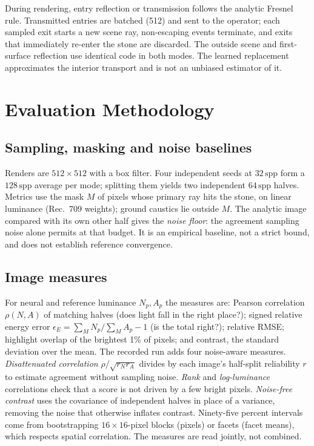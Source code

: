 \documentclass[conference]{IEEEtran}
\newcommand{\spp}{\,\mathrm{spp}}
\begin{document}
During rendering, entry reflection or transmission follows the analytic Fresnel
rule. Transmitted entries are batched (512) and sent to the operator; each
sampled exit starts a new scene ray, non-escaping events terminate, and exits
that immediately re-enter the stone are discarded. The outside scene and
first-surface reflection use identical code in both modes. The learned
replacement approximates the interior transport and is not an unbiased
estimator of it.

\section{Evaluation Methodology}
\label{sec:evaluation}
\subsection{Sampling, masking and noise baselines}
Renders are $512\times512$ with a box filter. Four independent seeds at
$32\spp$ form a $128\spp$ average per mode; splitting them yields two independent
$64\spp$ halves. Metrics use the mask $M$ of pixels whose primary ray hits the
stone, on linear luminance (Rec.~709 weights); ground caustics lie outside $M$.
The analytic image compared with its own other half gives the \emph{noise
floor}: the agreement sampling noise alone permits at that budget. It is an
empirical baseline, not a strict bound, and does not establish reference
convergence.

\subsection{Image measures}
For neural and reference luminance $N_p,A_p$ the measures are: Pearson
correlation $\rho(N,A)$ of matching halves (does light fall in the right
place?); signed relative energy error
$\epsilon_E=\sum_M N_p/\sum_M A_p-1$ (is the total right?); relative RMSE;
highlight overlap of the brightest 1\% of pixels; and contrast, the standard
deviation over the mean. The recorded run adds four noise-aware measures.
\emph{Disattenuated correlation} $\rho/\sqrt{r_Nr_A}$ divides by each image's
half-split reliability $r$ to estimate agreement without sampling noise.
\emph{Rank} and \emph{log-luminance} correlations check that a score is not
driven by a few bright pixels. \emph{Noise-free contrast} uses the covariance of
independent halves in place of a variance, removing the noise that otherwise
inflates contrast. Ninety-five percent intervals come from bootstrapping
$16\times16$-pixel blocks (pixels) or facets (facet means), which respects
spatial correlation. The measures are read jointly, not combined.
\end{document}
